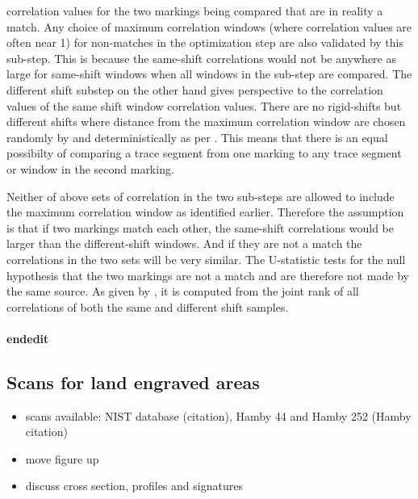 \documentclass[12pt]{article}
\providecommand{\tightlist}{%
  \setlength{\itemsep}{0pt}\setlength{\parskip}{0pt}}
\begin{document}
correlation values for the two markings being compared that are in
reality a match. Any choice of maximum correlation windows (where
correlation values are often near 1) for non-matches in the optimization
step are also validated by this sub-step. This is because the same-shift
correlations would not be anywhere as large for same-shift windows when
all windows in the sub-step are compared. The different shift substep on
the other hand gives perspective to the correlation values of the same
shift window correlation values. There are no rigid-shifts but different
shifts where distance from the maximum correlation window are chosen
randomly by \citet{chumbley} and deterministically as per
\citet{hadler}. This means that there is an equal possibilty of
comparing a trace segment from one marking to any trace segment or
window in the second marking.

Neither of above sets of correlation in the two sub-steps are allowed to
include the maximum correlation window as identified earlier. Therefore
the assumption is that if two markings match each other, the same-shift
correlations would be larger than the different-shift windows. And if
they are not a match the correlations in the two sets will be very
similar. The U-statistic tests for the null hypothesis that the two
markings are not a match and are therefore not made by the same source.
As given by \citet{hadler}, it is computed from the joint rank of all
correlations of both the same and different shift samples.

\paragraph{endedit}\label{endedit}


\subsection{Scans for land engraved
areas}\label{scans-for-land-engraved-areas-1}

\begin{itemize}
\tightlist
\item
  scans available: NIST database (citation), Hamby 44 and Hamby 252
  (Hamby citation)
\item
  move figure up
\item
  discuss cross section, profiles and signatures
\end{itemize}
\end{document}
